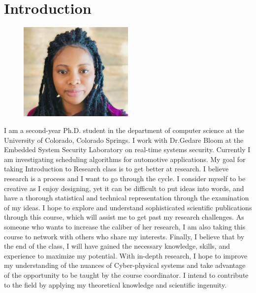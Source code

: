 
% 

\maketitle

\section{Introduction}

\begin{figure}[h!]
  \centering
  \includegraphics[width=0.5\textwidth]{omolade_.jpg}
\end{figure}

I am a second-year Ph.D. student in the department of computer science at the University of Colorado, Colorado Springs. I work with Dr.Gedare Bloom at the Embedded System Security Laboratory on real-time systems security. Currently I am investigating scheduling algorithms for automotive applications. My goal for taking Introduction to Research class is to get better at research. I believe research is a process and I want to go through the cycle. I consider myself to be creative as I enjoy designing, yet it can be difficult to put ideas into words, and have a thorough statistical and technical representation through the examination of my ideas.
I hope to explore and understand sophisticated scientific publications through this course, which will assist me to get past my research challenges. As someone who wants to increase the caliber of her research, I am also taking this course to network with others who share my interests.
Finally, I believe that by the end of the class, I will have gained the necessary knowledge, skills, and experience to  maximize my potential. With in-depth research, I hope to improve my understanding of the nuances of Cyber-physical systems and take advantage of the opportunity to be taught by the course coordinator. I intend to contribute to the field by applying my theoretical knowledge and scientific ingenuity.
